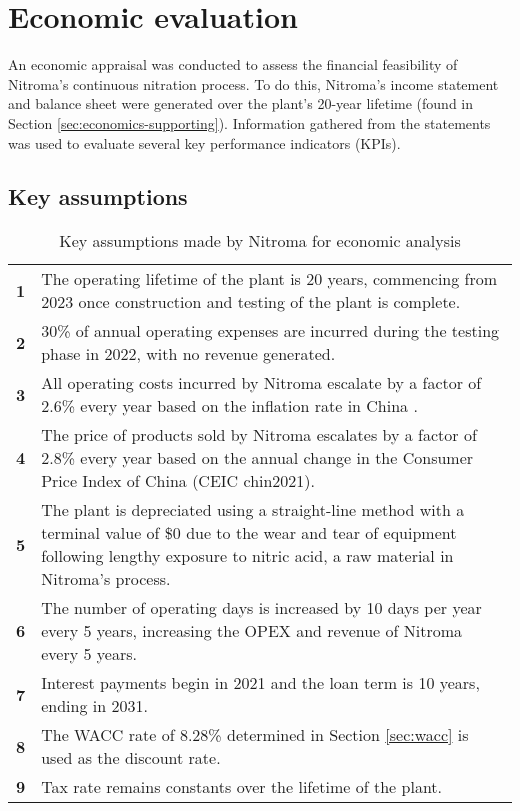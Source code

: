 \section{Economic evaluation}
An economic appraisal was conducted to assess the financial feasibility of Nitroma’s continuous nitration process. To do this, Nitroma’s income statement and balance sheet were generated over the plant’s 20-year lifetime (found in Section \ref{sec:economics-supporting}). Information gathered from the statements was used to evaluate several key performance indicators (KPIs).

\subsection{Key assumptions}

 \begin{table}[h]
    \vspace{-\intextsep}
    \centering
        \caption{Key assumptions made by Nitroma for economic analysis}
        \label{tab:assumptions-econ}
    \begin{tabular}{@{}lp{15cm}@{}}
    \toprule
   \textbf{1} & The operating lifetime of the plant is 20 years, commencing from 2023 once construction and testing of the plant is complete.   \\ 
   \textbf{2}      & 30\% of annual operating expenses are incurred during the testing phase in 2022, with no revenue generated.   \\
   \textbf{3}     & All operating costs incurred by Nitroma escalate by a factor of 2.6\% every year based on the inflation rate in China \cite{statista_inflation_2021}.   \\
   \textbf{4}                   & The price of products sold by Nitroma escalates by a factor of 2.8\% every year based on the annual change in the Consumer Price Index of China (CEIC chin2021).   \\
    \textbf{5}         & The plant is depreciated using a straight-line method with a terminal value of \$0 due to the wear and tear of equipment following lengthy exposure to nitric acid, a raw material in Nitroma's process.    \\ 
    \textbf{6} & The number of operating days is increased by 10 days per year every 5 years, increasing the OPEX and revenue of Nitroma every 5 years.\\
    \textbf{7} & Interest  payments begin in 2021 and the loan term is 10 years, ending in 2031. \\
    \textbf{8} & The WACC rate of 8.28\% determined in Section \ref{sec:wacc} is used as the discount rate. \\
    \textbf{9} & Tax rate remains constants over the lifetime of the plant. \\
  \bottomrule
    \end{tabular}
    \end{table}

